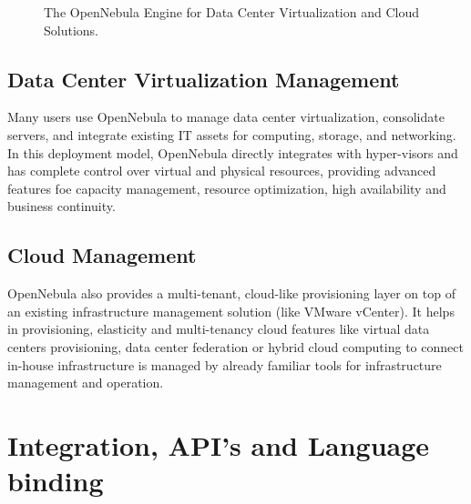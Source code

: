 \documentclass[9pt,twocolumn,twoside]{../../styles/osajnl}
\begin{document}
\begin{figure}[htbp]
	\centering
	\caption{The OpenNebula Engine for Data Center Virtualization and 
		Cloud Solutions.}
	\label{fig:false-color}
\end{figure}

\subsection{Data Center Virtualization Management}

Many users use OpenNebula to manage {data center 
virtualization}\cite{www-dcv-opennebula}, 
consolidate servers, and integrate existing IT assets for computing, 
storage, and networking. In this deployment model, OpenNebula 
directly integrates with hyper-visors and has complete control over 
virtual and physical resources, providing advanced features foe 
capacity management, resource optimization, high availability and 
business continuity.

\subsection{Cloud Management}

OpenNebula also provides a multi-tenant, cloud-like provisioning 
layer on top of an existing infrastructure management solution (like 
VMware vCenter). It helps in provisioning, elasticity and 
multi-tenancy cloud features like virtual data centers provisioning, 
data center federation or hybrid cloud computing to connect in-house 
infrastructure is managed by already familiar tools for 
infrastructure management and operation. 

\section{Integration, API's and Language binding}
\end{document}
